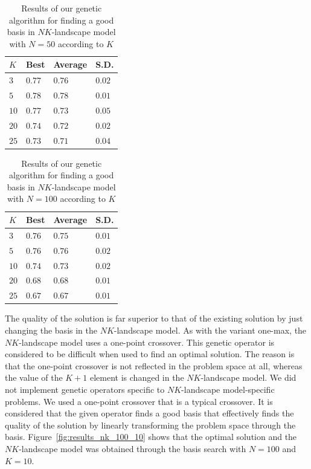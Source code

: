 \begin{table}[H]
  \caption{Results of our genetic algorithm for finding a good basis in $ NK $-landscape model with $ N = 50 $ according to $ K $}
  \label{tab:results_nk_cob_50}
  \begin{tabularx}{0.45\textwidth}{YYYY}
    \toprule
    $ K $    & Best & Average     &  S.D. \\
    \midrule
    $ 3  $  &  $ 0.77 $  &  $ 0.76 $  &  $ 0.02 $ \\
    $ 5  $  &  $ 0.78 $  &  $ 0.78 $  &  $ 0.01 $ \\
    $ 10 $  &  $ 0.77 $  &  $ 0.73 $  &  $ 0.05 $ \\
    $ 20 $  &  $ 0.74 $  &  $ 0.72 $  &  $ 0.02 $ \\
    $ 25 $  &  $ 0.73 $  &  $ 0.71 $  &  $ 0.04 $ \\
  \bottomrule
  \end{tabularx}
\end{table}

\begin{table}[H]
  \caption{Results of our genetic algorithm for finding a good basis in $ NK $-landscape model with $ N = 100 $ according to $ K $}
  \label{tab:results_nk_cob_100}
  \begin{tabularx}{0.45\textwidth}{YYYY}
    \toprule
    $ K $    & Best & Average     &  S.D. \\
    \midrule
    $ 3  $  &  $ 0.76 $  &  $ 0.75 $  &  $ 0.01 $ \\
    $ 5  $  &  $ 0.76 $  &  $ 0.76 $  &  $ 0.02 $ \\
    $ 10 $  &  $ 0.74 $  &  $ 0.73 $  &  $ 0.02 $ \\
    $ 20 $  &  $ 0.68 $  &  $ 0.68 $  &  $ 0.01 $ \\
    $ 25 $  &  $ 0.67 $  &  $ 0.67 $  &  $ 0.01 $ \\
  \bottomrule
  \end{tabularx}
\end{table}

The quality of the solution is far superior to that of the existing solution by just changing the basis in the $NK$-landscape model.
As with the variant one-max, the $NK$-landscape model uses a one-point crossover.
This genetic operator is considered to be difficult when used to find an optimal solution.
The reason is that the one-point crossover is not reflected in the problem space at all,
whereas the value of the $K+1$ element is changed in the $NK$-landscape model.
We did not implement genetic operators specific to $NK$-landscape model-specific problems.
We used a one-point crossover that is a typical crossover.
It is considered that the given operator finds a good basis that effectively finds the quality of the solution by linearly transforming the problem space through the basis.
Figure~\ref{fig:results_nk_100_10} shows that the optimal solution and the $NK$-landscape model was obtained through the basis search with $ N = 100 $ and $ K = 10 $.


